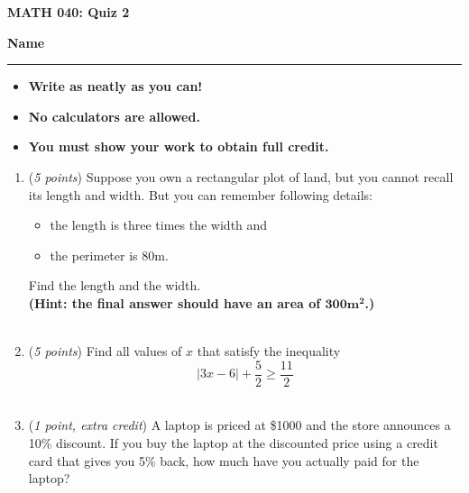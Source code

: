 \documentclass[12 pt]{article}
\begin{document}
  \begin{center}
    \textbf{\hfill MATH 040: Quiz 2} \\
  \end{center}
  \medskip

  \noindent
  \textbf{Name}\ \rule{3.5in}{.4pt} \hfill
  \vspace{.1in}
  \hspace*{0.2in}
  \begin{itemize}
    \item \textbf{Write as neatly as you can!}
    \item \textbf{No calculators are allowed.}
    \item \textbf{You must show your work to obtain full credit.}
  \end{itemize}

	\medskip
  \noindent

  \begin{enumerate}
    \item (\textit{5 points})
    Suppose you own a rectangular plot of land, but you cannot recall its length
    and width. But you can remember following details:
    \begin{itemize}
      \item the length is three times the width and
      \item the perimeter is 80m.
    \end{itemize}
    Find the length and the width.\\
    \textbf{(Hint: the final answer should have an area of $\mathbf{300m^2}$.)}
    \\~\\


		\pagebreak
		\item (\textit{5 points}) Find all values of $x$ that satisfy the inequality \[
      |3x - 6| + \frac{5}{2}  \geq \frac{11}2
    \]
    \vspace{3in}
    \\
    \item (\textit{1 point, extra credit})
    A laptop is priced at \$1000 and the store announces a 10\% discount.
    If you buy the laptop at the discounted price using a credit card that
    gives you 5\% back, how much have you actually paid for the laptop?
  \end{enumerate}
\end{document}

